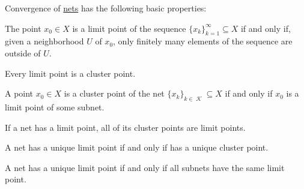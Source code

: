 \begin{proposition}\label{thm:net_convergence_properties}
  Convergence of \hyperref[def:net_convergence]{nets} has the following basic properties:

  \begin{thmenum}
     The point \( x_0 \in X \) is a limit point of the sequence \( \{ x_k \}_{k=1}^\infty \subseteq X \) if and only if, given a neighborhood \( U \) of \( x_0 \), only finitely many elements of the sequence are outside of \( U \).

     Every limit point is a cluster point.

     A point \( x_0 \in X \) is a cluster point of the net \( \{ x_k \}_{k \in \mscrK} \subseteq X \) if and only if \( x_0 \) is a limit point of some subnet.

     If a net has a limit point, all of its cluster points are limit points.

     A net has a unique limit point if and only if has a unique cluster point.

     A net has a unique limit point if and only if all subnets have the same limit point.
  \end{thmenum}
\end{proposition}
